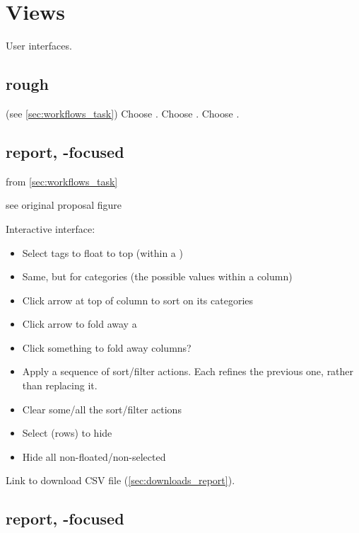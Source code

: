 \section{Views}

User interfaces.

\subsection{rough}

(see \cref{sec:workflows_task})
Choose \Task.
Choose \Methods.
Choose \Elements.

\subsection{\Performance report, \Task-focused}
\label{sec:views_performance_task}

from \cref{sec:workflows_task}

see original proposal figure

Interactive interface:
\begin{itemize}
    \item Select tags to float \Elements to top (within a \Refset)
    \item Same, but for categories (\ie the possible values within a column)
    \item Click arrow at top of column to sort on its categories
    \item Click arrow to fold away a \Refset
    \item Click something to fold away columns?
    \item Apply a sequence of sort/filter actions.  Each refines the previous one, rather than replacing it.
    \item Clear some/all the sort/filter actions
    \item Select \Elements (rows) to hide
    \item Hide all non-floated/non-selected \Elements
\end{itemize}

Link to download CSV file (\cref{sec:downloads_report}).

\subsection{\Performance report, \Method-focused}
\label{sec:views_performance_method}

